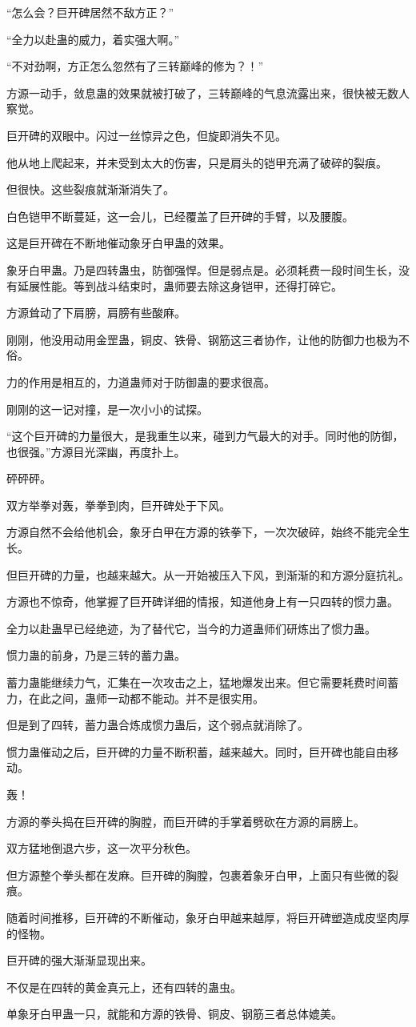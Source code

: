 \begin{this_body}
“怎么会？巨开碑居然不敌方正？”

“全力以赴蛊的威力，着实强大啊。”

“不对劲啊，方正怎么忽然有了三转巅峰的修为？！”

方源一动手，敛息蛊的效果就被打破了，三转巅峰的气息流露出来，很快被无数人察觉。

巨开碑的双眼中。闪过一丝惊异之色，但旋即消失不见。

他从地上爬起来，并未受到太大的伤害，只是肩头的铠甲充满了破碎的裂痕。

但很快。这些裂痕就渐渐消失了。

白色铠甲不断蔓延，这一会儿，已经覆盖了巨开碑的手臂，以及腰腹。

这是巨开碑在不断地催动象牙白甲蛊的效果。

象牙白甲蛊。乃是四转蛊虫，防御强悍。但是弱点是。必须耗费一段时间生长，没有延展性能。等到战斗结束时，蛊师要去除这身铠甲，还得打碎它。

方源耸动了下肩膀，肩膀有些酸麻。

刚刚，他没用动用金罡蛊，铜皮、铁骨、钢筋这三者协作，让他的防御力也极为不俗。

力的作用是相互的，力道蛊师对于防御蛊的要求很高。

刚刚的这一记对撞，是一次小小的试探。

“这个巨开碑的力量很大，是我重生以来，碰到力气最大的对手。同时他的防御，也很强。”方源目光深幽，再度扑上。

砰砰砰。

双方举拳对轰，拳拳到肉，巨开碑处于下风。

方源自然不会给他机会，象牙白甲在方源的铁拳下，一次次破碎，始终不能完全生长。

但巨开碑的力量，也越来越大。从一开始被压入下风，到渐渐的和方源分庭抗礼。

方源也不惊奇，他掌握了巨开碑详细的情报，知道他身上有一只四转的惯力蛊。

全力以赴蛊早已经绝迹，为了替代它，当今的力道蛊师们研炼出了惯力蛊。

惯力蛊的前身，乃是三转的蓄力蛊。

蓄力蛊能继续力气，汇集在一次攻击之上，猛地爆发出来。但它需要耗费时间蓄力，在此之间，蛊师一动都不能动。并不是很实用。

但是到了四转，蓄力蛊合炼成惯力蛊后，这个弱点就消除了。

惯力蛊催动之后，巨开碑的力量不断积蓄，越来越大。同时，巨开碑也能自由移动。

轰！

方源的拳头捣在巨开碑的胸膛，而巨开碑的手掌着劈砍在方源的肩膀上。

双方猛地倒退六步，这一次平分秋色。

但方源整个拳头都在发麻。巨开碑的胸膛，包裹着象牙白甲，上面只有些微的裂痕。

随着时间推移，巨开碑的不断催动，象牙白甲越来越厚，将巨开碑塑造成皮坚肉厚的怪物。

巨开碑的强大渐渐显现出来。

不仅是在四转的黄金真元上，还有四转的蛊虫。

单象牙白甲蛊一只，就能和方源的铁骨、铜皮、钢筋三者总体媲美。

\end{this_body}

